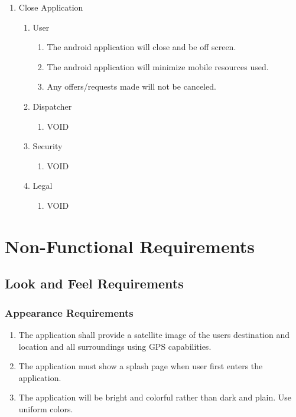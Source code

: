 \documentclass[english]{article}
\begin{document}
\begin{enumerate}[{BE}1.]
	\item Close Application
	\begin{enumerate}[{VP12}.1]
		\item User
			\begin{enumerate}
				\item The android application will close and be off screen.
				\item The android application will minimize mobile resources used.
				\item Any offers/requests made will not be canceled.
			\end{enumerate}
		\item Dispatcher
			\begin{enumerate}
				\item VOID
			\end{enumerate}
		\item Security
			\begin{enumerate}
				\item VOID
			\end{enumerate}
		\item Legal
			\begin{enumerate}
				\item VOID
			\end{enumerate}
	\end{enumerate}

\end{enumerate}


\section{Non-Functional Requirements}
\label{sec:non-functional_requirements}
\subsection{Look and Feel Requirements}
\label{sub:look_and_feel_requirements}

\subsubsection{Appearance Requirements}
\label{ssub:appearance_requirements}
\begin{enumerate}[{AR}1. ]
	\item The application shall provide a satellite image of the users destination and location and all surroundings using GPS capabilities.
	\item The application must show a splash page when user first enters the application.
	\item The application will be bright and colorful rather than dark and plain. Use uniform colors.
\end{enumerate}
\end{document}
